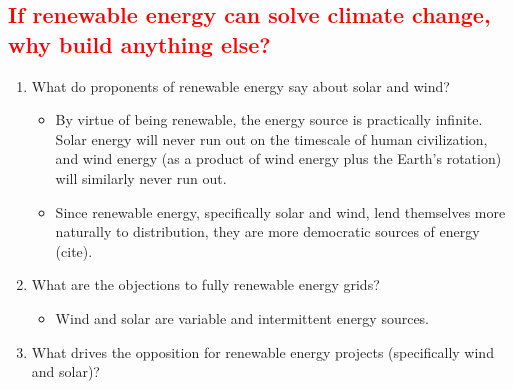 \subsection{\textcolor{red}{If renewable energy can solve climate change, why build anything else?}}

\begin{enumerate}
    \item What do proponents of renewable energy say about solar and wind?
    \begin{itemize}
        \item By virtue of being renewable, the energy source is practically infinite. Solar energy will 
        never run out on the timescale of human civilization, and wind energy (as a product of wind energy plus
        the Earth's rotation) will similarly never run out.
        \item Since renewable energy, specifically solar and wind, lend themselves more naturally to distribution,
        they are more democratic sources of energy (cite).
    \end{itemize}
    \item What are the objections to fully renewable energy grids?
    \begin{itemize}
        \item Wind and solar are variable and intermittent energy sources.
    \end{itemize}
    \item What drives the opposition for renewable energy projects (specifically wind and solar)?
\end{enumerate}